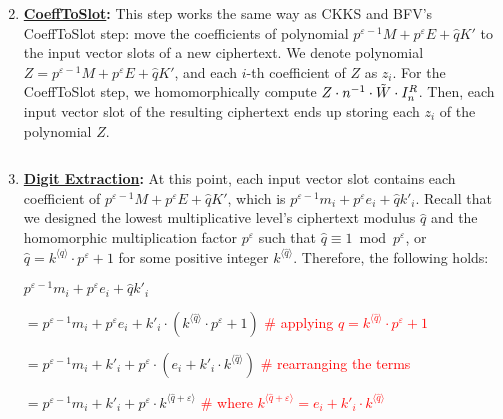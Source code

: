 \begin{enumerate}

$ $

\item \textbf{\textsf{\underline{CoeffToSlot}}:} This step works the same way as CKKS and BFV's \textsf{CoeffToSlot} step: move the coefficients of polynomial $p^{\varepsilon-1} M + p^\varepsilon E + \hat{q}K'$ to the input vector slots of a new ciphertext. We denote polynomial $Z = p^{\varepsilon-1} M + p^\varepsilon E + \hat{q}K'$, and each $i$-th coefficient of $Z$ as $z_i$. For the \textsf{CoeffToSlot} step, we homomorphically compute $Z \cdot n^{-1} \cdot \tilde W \cdot I_n^R$. Then, each input vector slot of the resulting ciphertext ends up storing each $z_i$ of the polynomial $Z$. 

$ $

\item \textbf{\underline{Digit Extraction}:} At this point, each input vector slot contains each coefficient of $p^{\varepsilon-1} M + p^\varepsilon E + \hat{q}K'$, which is $p^{\varepsilon-1} m_i + p^\varepsilon e_i + \hat{q}k'_i$. Recall that we designed the lowest multiplicative level's ciphertext modulus $\hat{q}$ and the homomorphic multiplication factor $p^\varepsilon$ such that $\hat{q} \equiv 1 \bmod p^\varepsilon$, or $\hat{q} = k^{\langle \hat{q} \rangle } \cdot p^\varepsilon + 1$ for some positive integer $k^{\langle \hat{q} \rangle }$. Therefore, the following holds: 

$p^{\varepsilon-1} m_i + p^\varepsilon e_i + \hat{q}k'_i$

$ = p^{\varepsilon-1} m_i + p^\varepsilon e_i + k'_i\cdot(k^{\langle \hat{q} \rangle } \cdot p^\varepsilon + 1) $  \textcolor{red}{ \# applying $\hat{q} = k^{\langle \hat{q} \rangle } \cdot p^\varepsilon + 1$}

$ = p^{\varepsilon-1} m_i + k'_i + p^\varepsilon  \cdot (e_i + k'_i\cdot k^{\langle \hat{q} \rangle }) $ \textcolor{red}{ \# rearranging the terms}

$ = p^{\varepsilon-1} m_i + k'_i + p^\varepsilon \cdot k^{\langle \hat{q} + \varepsilon \rangle } $ \textcolor{red}{ \# where $ k^{\langle \hat{q} + \varepsilon \rangle } = e_i + k'_i\cdot k^{\langle \hat{q} \rangle } $}


\end{enumerate}
